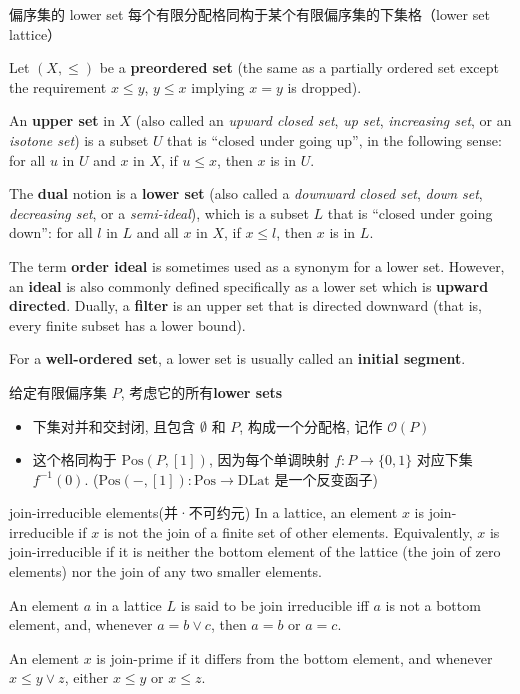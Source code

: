 \documentclass{beamer}
\newcommand{\Pos}{\mathrm{Pos}}
\newcommand{\DLat}{\mathrm{DLat}}
\begin{document}
\begin{frame}{偏序集的 lower set \cite{lower_set}}
每个有限分配格同构于某个有限偏序集的下集格（lower set lattice）

Let $(X, \leq)$ be a \textbf{preordered set} (the same as a partially ordered set except the requirement $x \leq y$, $y \leq x$ implying $x = y$ is dropped).

An \textbf{upper set} in $X$ (also called an \emph{upward closed set}, \emph{up set}, \emph{increasing set}, or an \emph{isotone set}) is a subset $U$ that is ``closed under going up'', in the following sense: for all $u$ in $U$ and $x$ in $X$, if $u \leq x$, then $x$ is in $U$.

The \textbf{dual} notion is a \textbf{lower set} (also called a \emph{downward closed set}, \emph{down set}, \emph{decreasing set}, or a \emph{semi-ideal}), which is a subset $L$ that is ``closed under going down'': for all $l$ in $L$ and all $x$ in $X$, if $x \leq l$, then $x$ is in $L$.

The term \textbf{order ideal} is sometimes used as a synonym for a lower set. However, an \textbf{ideal} is also commonly defined specifically as a lower set which is \textbf{upward directed}. Dually, a \textbf{filter} is an upper set that is directed downward (that is, every finite subset has a lower bound).

For a \textbf{well-ordered set}, a lower set is usually called an \textbf{initial segment}.
\end{frame}

\begin{frame}
给定有限偏序集 $P$, 考虑它的所有\textbf{lower sets}
\begin{itemize}
    \item 下集对并和交封闭, 且包含 $\emptyset$ 和 $P$, 构成一个分配格, 记作 $\mathcal{O}(P)$
    \item 这个格同构于 $\Pos(P,[1])$, 因为每个单调映射 $f : P\to \{0,1\}$ 对应下集 $f^{-1}(0)$. ($\Pos(-,[1]) : \Pos \to \DLat$ 是一个反变函子)
\end{itemize}
\end{frame}

\begin{frame}{join-irreducible elements(并·不可约元)}
In a lattice, an element $x$ is join-irreducible if $x$ is not the join of a finite set of other elements. Equivalently, $x$ is join-irreducible if it is neither the bottom element of the lattice (the join of zero elements) nor the join of any two smaller elements.

\vspace{5mm}
An element $a$ in a lattice $L$ is said to be join irreducible iff $a$ is not a bottom element, and, whenever $a=b∨c$, then $a=b$ or $a=c$. 

\vspace{5mm}
 An element $x$ is join-prime if it differs from the bottom element, and whenever $x ≤ y ∨ z$, either $x ≤ y$ or $x ≤ z$.
\end{frame}
\end{document}

